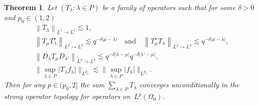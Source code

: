 \documentclass[a4paper]{amsart}
\newcommand{\norm}[1]{{\left\lVert #1 \right\rVert}}
\newcommand{\abs}[1]{{\lvert {#1} \rvert}}
\newcommand{\pnorm}[2]{{\norm{{#1}}_{L^{#2} \rightarrow L^{#2}}}}
\newcommand{\seq}[2]{\left({#1}: {#2}\right)}
\theoremstyle{plain}
\newtheorem{theorem}{Theorem}
\theoremstyle{definition}
\theoremstyle{remark}
\numberwithin{equation}{section}
\theoremstyle{plain}
\begin{document}
\begin{theorem}
  \label{th:6}
  Let $\seq{T_\lambda}{\lambda \in P}$ be a family of operators such that for some
  $\delta > 0$ and $p_0 \in (1, 2)$
  \begin{gather}
    \pnorm{T_\lambda}{1} \lesssim 1, \label{eq:30.1} \\
    \pnorm{T_\mu T_\lambda^\star}{2} \lesssim q^{-\delta \abs{\mu-\lambda}} 
    \quad \text{and} 
    \quad \pnorm{T_\mu^\star T_\lambda}{2} \lesssim q^{-\delta \abs{\mu-\lambda}}, 
    \label{eq:30.2}\\
    \pnorm{D_\lambda T_\mu D_{\lambda'}}{2} 
    \lesssim q^{-\delta \abs{\lambda-\mu}} q^{-\delta \abs{\lambda'-\mu}},
    \label{eq:30.3}\\
    \big\lVert{\sup_{\lambda \in P} \abs{T_\lambda f_\lambda}}\big\rVert_{L^{p_0}}
    \lesssim 
	\big\lVert \sup_{\lambda \in P} \abs{f_\lambda} \big\rVert_{L^{p_0}}. 
    \label{eq:30.4}
  \end{gather}
  Then for any $p \in (p_0, 2]$ the sum $\sum_{\lambda \in P}
    T_\lambda$ converges unconditionally in the strong operator
    topology for operators on~$L^p(\Omega_0)$.
\end{theorem}
\end{document}
